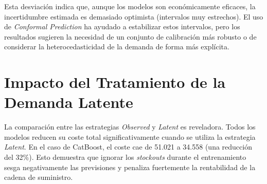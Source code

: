 Esta desviación indica que, aunque los modelos son económicamente eficaces, la incertidumbre estimada es demasiado optimista (intervalos muy estrechos). El uso de \textit{Conformal Prediction} ha ayudado a estabilizar estos intervalos, pero los resultados sugieren la necesidad de un conjunto de calibración más robusto o de considerar la heterocedasticidad de la demanda de forma más explícita.

\section{Impacto del Tratamiento de la Demanda Latente}
La comparación entre las estrategias \textit{Observed} y \textit{Latent} es reveladora. Todos los modelos reducen su coste total significativamente cuando se utiliza la estrategia \textit{Latent}. En el caso de CatBoost, el coste cae de 51.021 a 34.558 (una reducción del 32\%). Esto demuestra que ignorar los \textit{stockouts} durante el entrenamiento sesga negativamente las previsiones y penaliza fuertemente la rentabilidad de la cadena de suministro.
